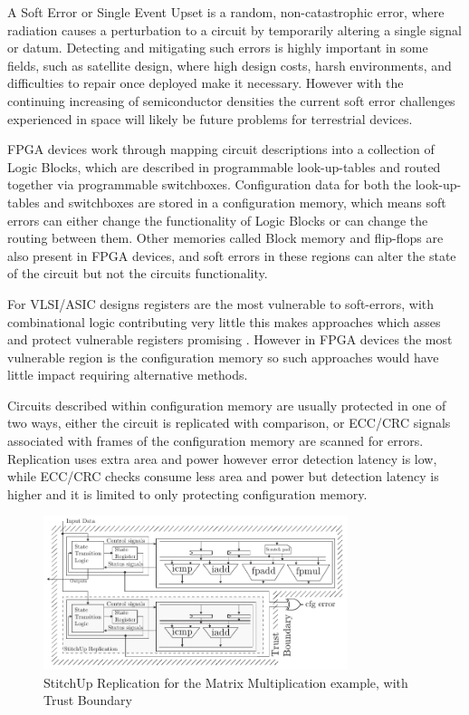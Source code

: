 A Soft Error or Single Event Upset is a random, non-catastrophic error, where radiation causes
a perturbation to a circuit by temporarily altering a single signal or datum.
Detecting and mitigating such errors is highly important in some fields, such as satellite design, 
where high design costs, harsh environments, and difficulties to repair once deployed make it necessary. 
However with the continuing increasing of semiconductor densities the current soft error
challenges experienced in space will likely be future problems for terrestrial devices\cite{normand1996single}\cite{henkel2013reliable}.

FPGA devices work through mapping circuit descriptions into a collection of Logic Blocks,
which are described in programmable look-up-tables and routed together via
programmable switchboxes.
Configuration data for both the look-up-tables and switchboxes are stored in a
configuration memory, which means soft errors can either change the functionality
of Logic Blocks or can change the routing between them.
Other memories called Block memory and flip-flops are also present in FPGA devices,
and soft errors in these regions can alter the state of the circuit but not the
circuits functionality.

For VLSI/ASIC designs registers are the most vulnerable to soft-errors, with
combinational logic contributing very little \cite{baumann2005soft} this makes
approaches which asses and protect vulnerable registers promising \cite{chen2014reliability}.
However in FPGA devices the most vulnerable region is the configuration memory
so such approaches would have little impact requiring alternative methods.

Circuits described within configuration memory are usually protected in one of two ways,
either the circuit is replicated with comparison, or ECC/CRC signals associated with
frames of the configuration memory are scanned for errors.
Replication uses extra area and power however error detection latency is low,
while ECC/CRC checks consume less area and power but detection latency is higher and
it is limited to only protecting configuration memory.

\begin{figure}[t]
\centering
\includegraphics[width=3.5in]{./imgs/StitchUpReplication.pdf}
\caption{StitchUp Replication for the Matrix Multiplication example, with Trust Boundary}
\label{fig:HLSArch}
\end{figure}

